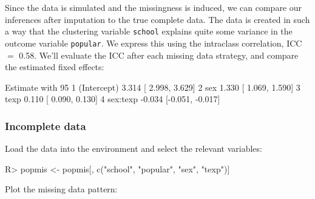 \documentclass[
]{jss}
\begin{document}
Since the data is simulated and the missingness is induced, we can
compare our inferences after imputation to the true complete data. The
data is created in such a way that the clustering variable
\texttt{school} explains quite some variance in the outcome variable
\texttt{popular}. We express this using the intraclass correlation, ICC
\(=\) 0.58. We'll evaluate the ICC after each missing data strategy, and
compare the estimated fixed effects:

\begin{CodeChunk}
\begin{CodeOutput}
                 Estimate with 95%
1 (Intercept)  3.314 [ 2.998,  3.629]
2         sex  1.330 [ 1.069,  1.590]
3        texp  0.110 [ 0.090,  0.130]
4    sex:texp -0.034 [-0.051, -0.017]
\end{CodeOutput}
\end{CodeChunk}

\hypertarget{incomplete-data}{%
\subsubsection{Incomplete data}\label{incomplete-data}}

Load the data into the environment and select the relevant variables:

\begin{CodeChunk}
\begin{CodeInput}
R> popmis <- popmis[, c("school", "popular", "sex", "texp")] 
\end{CodeInput}
\end{CodeChunk}

Plot the missing data pattern:
\end{document}
